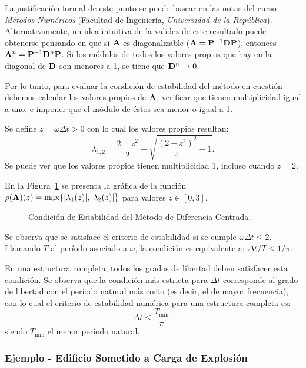 La justificación formal de este punto se puede buscar en las notas del curso \textit{Métodos Numéricos} (Facultad de Ingeniería, \textit{Universidad de la República}). %
%
Alternativamente, un idea intuitiva de la validez de este resultado puede obtenerse pensando en que si ${\bf A}$ es diagonalizable (${\bf A} = {\bf P}^{-1}{\bf D} {\bf P}$), entonces ${\bf A}^n = {\bf P}^{-1} {\bf D}^n {\bf P}$. Si los módulos de todos los valores propios que hay en la diagonal de ${\bf D}$ son menores a 1, se tiene que ${\bf D}^n\rightarrow 0$.

Por lo tanto, para evaluar la condición de estabilidad del método en cuestión debemos calcular los valores propios de ${\bf A}$, verificar que tienen multiplicidad igual a uno, e imponer que el módulo de éstos sea menor o igual a 1. 

Se define $z=\omega \Delta t>0$ con lo cual los valores propios resultan:
%
\begin{equation}\label{VProps}
\lambda_{1,2} = \frac{2-z^2}{2}\pm\sqrt{\frac{(2-z^2)^2}{4}-1}.
\end{equation}
%
Se puede ver que los valores propios tienen multiplicidad 1, incluso cuando $z=2$. %

En la Figura~\ref{fig:StabDifCentr} se presenta la gráfica de la función $\rho({\bf A})(z)=\max\{|\lambda_1(z)|,|\lambda_2(z)|\}$ para valores $z\in[0,3]$.

\begin{figure}[htb]
	\centering
	\resizebox{.58\linewidth}{!}{}
	\caption{Condición de Estabilidad del Método de Diferencia Centrada.}
	\label{fig:StabDifCentr}
\end{figure}

Se observa que se satisface el criterio de estabilidad si se cumple $\omega \Delta t \leq 2$. Llamando $T$ al período asociado a $\omega$, la condición es equivalente a: $\Delta t/ T \leq 1/\pi$.

En una estructura completa, todos los grados de libertad deben satisfacer esta condición. Se observa que la condición más estricta para $\Delta t$ corresponde al grado de libertad con el período natural más corto (es decir, el de mayor frecuencia), con lo cual el criterio de estabilidad numérica para una estructura completa es:
%
\begin{equation}
	\Delta t \leq \frac{T_{\text{min}}}{\pi},
\end{equation}
%
siendo $T_{\text{min}}$ el menor período natural.

\subsubsection{Ejemplo - Edificio Sometido a Carga de Explosión}\label{EjBlast}

